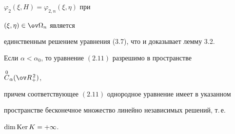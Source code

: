 $\varphi_2(\xi,H)=\varphi_{2,n}(\xi,\eta)$ при


$(\xi,\eta)\in\ov\Omega_n$ является


единственным решением уравнения (3.7), что и доказывает лемму 3.2.





\begin{lems}


Если $\alpha<\alpha_0$, то уравнение $(2.11)$ разрешимо в пространстве


$\OC_\alpha(\ov R^{\,2}_+)$,


причем соответствующее $(2.11)$ однородное уравнение имеет в указанном


пространстве бесконечное множество линейно независимых решений, т.\,е.


$\dim\operatorname{Ker} K=+\infty$.


\end{lems}






